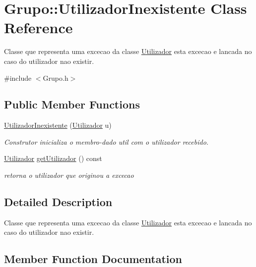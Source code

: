 \hypertarget{class_grupo_1_1_utilizador_inexistente}{}\section{Grupo\+:\+:Utilizador\+Inexistente Class Reference}
\label{class_grupo_1_1_utilizador_inexistente}


Classe que representa uma excecao da classe \hyperlink{class_utilizador}{Utilizador} esta excecao e lancada no caso do utilizador nao existir.  




{\ttfamily \#include $<$Grupo.\+h$>$}

\subsection*{Public Member Functions}
\begin{DoxyCompactItemize}
\item 
\hypertarget{class_grupo_1_1_utilizador_inexistente_a01683e0732e2af4cb7b6f3364384ff62}{}\hyperlink{class_grupo_1_1_utilizador_inexistente_a01683e0732e2af4cb7b6f3364384ff62}{Utilizador\+Inexistente} (\hyperlink{class_utilizador}{Utilizador} u)\label{class_grupo_1_1_utilizador_inexistente_a01683e0732e2af4cb7b6f3364384ff62}

\begin{DoxyCompactList}\small\item\em Construtor inicializa o membro-\/dado util com o utilizador recebido. \end{DoxyCompactList}\item 
\hyperlink{class_utilizador}{Utilizador} \hyperlink{class_grupo_1_1_utilizador_inexistente_afd26b37c26431fa057548b8b8db9e713}{get\+Utilizador} () const 
\begin{DoxyCompactList}\small\item\em retorna o utilizador que originou a excecao \end{DoxyCompactList}\end{DoxyCompactItemize}


\subsection{Detailed Description}
Classe que representa uma excecao da classe \hyperlink{class_utilizador}{Utilizador} esta excecao e lancada no caso do utilizador nao existir. 

\subsection{Member Function Documentation}
\hypertarget{class_grupo_1_1_utilizador_inexistente_afd26b37c26431fa057548b8b8db9e713}{}
